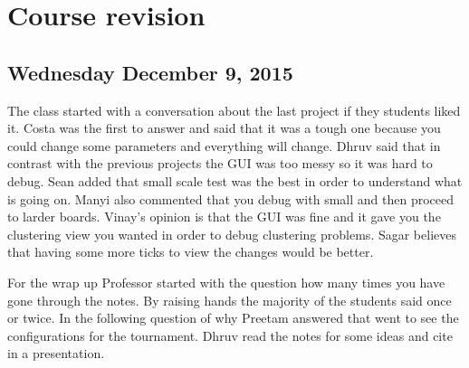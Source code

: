 \section{Course revision}
\subsection{Wednesday December 9, 2015}
The class started with a conversation about the last project if they students liked 
it. Costa was the first to answer and said that it was a tough one because you
could change some parameters and everything will change. Dhruv said that in contrast
with the previous projects the GUI was too messy so it was hard to debug. Sean
added that small scale test was the best in order to understand what is going on.
Manyi also commented that you debug with small and then proceed to larder boards.
Vinay's opinion is that the GUI was fine and it gave you the clustering view you 
wanted in order to debug clustering problems. Sagar believes that having some more
ticks to view the changes would be better.

For the wrap up Professor started with the question how many times you have gone
through the notes. By raising hands the majority of the students said once or twice.
In the following question of why Preetam answered that went to see the configurations
for the tournament. Dhruv read the notes for some ideas and cite in a presentation.

